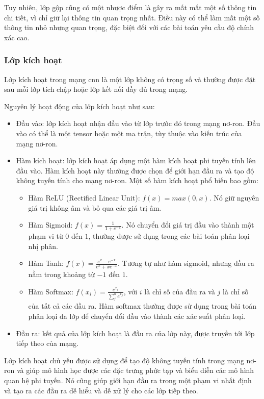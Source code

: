 Tuy nhiên, lớp gộp cũng có một nhược điểm là gây ra mất mất một số thông tin chi tiết, vì chỉ giữ lại thông tin quan trọng nhất. Điều này có thể làm mất một số thông tin nhỏ nhưng quan trọng, đặc biệt đối với các bài toán yêu cầu độ chính xác cao.

\subsubsection{Lớp kích hoạt}
Lớp kích hoạt trong mạng \acrshort{cnn} là một lớp không có trọng số và thường được đặt sau mỗi lớp tích chập hoặc lớp kết nối đầy đủ trong mạng.

Nguyên lý hoạt động của lớp kích hoạt như sau:

\begin{itemize}
    \item Đầu vào: lớp kích hoạt nhận đầu vào từ lớp trước đó trong mạng nơ-ron. Đầu vào có thể là một tensor hoặc một ma trận, tùy thuộc vào kiến trúc của mạng nơ-ron.
    \item Hàm kích hoạt: lớp kích hoạt áp dụng một hàm kích hoạt phi tuyến tính lên đầu vào. Hàm kích hoạt này thường được chọn để giới hạn đầu ra và tạo độ không tuyến tính cho mạng nơ-ron. Một số hàm kích hoạt phổ biến bao gồm:
    \begin{itemize}
        \item Hàm ReLU (Rectified Linear Unit): $f(x) = max(0, x)$. Nó giữ nguyên giá trị không âm và bỏ qua các giá trị âm.
        \item Hàm Sigmoid: $f(x) = \frac{1}{1 + e^{-x}}$. Nó chuyển đổi giá trị đầu vào thành một phạm vi từ $0$ đến $1$, thường được sử dụng trong các bài toán phân loại nhị phân.
        \item Hàm Tanh: $f(x) = \frac{e^x - e^{-x}}{e^x +x e^{-x}}$. Tương tự như hàm sigmoid, nhưng đầu ra nằm trong khoảng từ $-1$ đến $1$.
        \item Hàm Softmax: $f(x_i) = \frac{e^{x_i}}{\sum^n_j e^{x_j}}$, với $i$ là chỉ số của đầu ra và $j$ là chỉ số của tất cả các đầu ra. Hàm softmax thường được sử dụng trong bài toán phân loại đa lớp để chuyển đổi đầu vào thành các xác suất phân loại.
    
    \end{itemize}
    \item Đầu ra: kết quả của lớp kích hoạt là đầu ra của lớp này, được truyền tới lớp tiếp theo của mạng.
\end{itemize}
    
Lớp kích hoạt chủ yếu được sử dụng để tạo độ không tuyến tính trong mạng nơ-ron và giúp mô hình học được các đặc trưng phức tạp và biểu diễn các mô hình quan hệ phi tuyến. Nó cũng giúp giới hạn đầu ra trong một phạm vi nhất định và tạo ra các đầu ra dễ hiểu và dễ xử lý cho các lớp tiếp theo.

